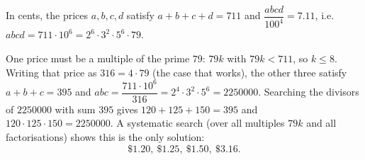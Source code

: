 In cents, the prices $a,b,c,d$ satisfy $a+b+c+d=711$ and $\dfrac{abcd}{100^4}=7.11$, i.e. $abcd=711\cdot10^6=2^6\cdot3^2\cdot5^6\cdot79$.

One price must be a multiple of the prime $79$: $79k$ with $79k<711$, so $k\le8$. Writing that price as $316=4\cdot79$ (the case that works), the other three satisfy $a+b+c=395$ and $abc=\dfrac{711\cdot10^6}{316}=2^4\cdot3^2\cdot5^6=2250000$. Searching the divisors of $2250000$ with sum $395$ gives $120+125+150=395$ and $120\cdot125\cdot150=2250000$. A systematic search (over all multiples $79k$ and all factorisations) shows this is the only solution:
\[\boxed{\$1.20,\ \$1.25,\ \$1.50,\ \$3.16}.\]
